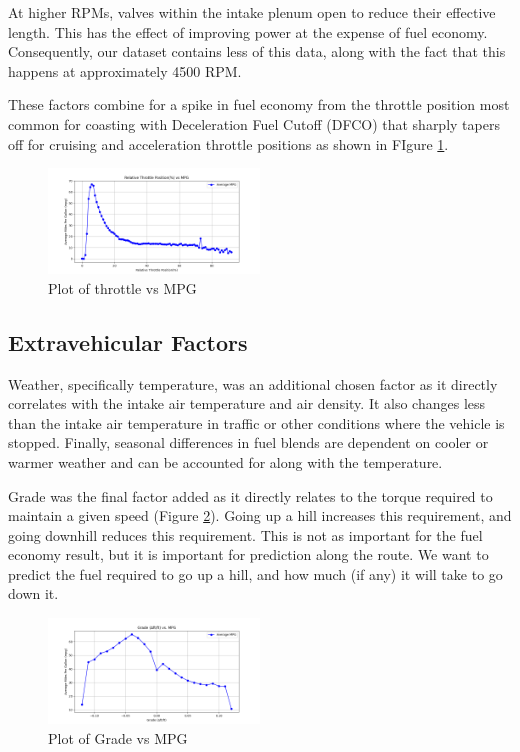 \documentclass[letterpaper]{article}
\begin{document}
At higher RPMs, valves within the intake plenum open to reduce their 
effective length. This has the effect of improving power at the expense 
of fuel economy. Consequently, our dataset contains less of this data, 
along with the fact that this happens at approximately 4500 RPM.

These factors combine for a spike in fuel economy from the throttle 
position most common for coasting with Deceleration Fuel Cutoff (DFCO) 
that sharply tapers off for cruising and acceleration throttle positions 
as shown in FIgure \ref{fig:throttlevsmpg}. 

\begin{figure}[htbp]
    \centering
    \includegraphics[width=0.5\textwidth]{figures/throttle_vs_mpg.png}
    \caption{Plot of throttle vs MPG}
    \label{fig:throttlevsmpg}
\end{figure}

\subsection*{Extravehicular Factors}

Weather, specifically temperature, was an additional chosen factor as it 
directly correlates with the intake air temperature and air density. It 
also changes less than the intake air temperature in traffic or other 
conditions where the vehicle is stopped. Finally, seasonal differences in 
fuel blends are dependent on cooler or warmer weather and can be accounted 
for along with the temperature.

Grade was the final factor added as it directly relates to the torque 
required to maintain a given speed (Figure \ref{fig:gradevsmpg}). Going up 
a hill increases this requirement, and going downhill reduces this 
requirement. This is not as important for the fuel economy result, but it 
is important for prediction along the route. We want to predict the fuel 
required to go up a hill, and how much (if any) it will take to go down it. 

\begin{figure}[htbp]
    \centering
    \includegraphics[width=0.5\textwidth]{figures/grade_vs_mpg.png}
    \caption{Plot of Grade vs MPG}
    \label{fig:gradevsmpg}
\end{figure}
\end{document}
